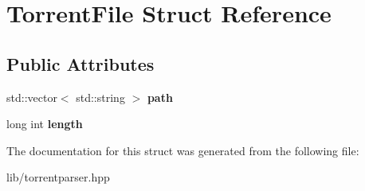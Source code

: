 \hypertarget{structTorrentFile}{}\section{Torrent\+File Struct Reference}
\label{structTorrentFile}
\subsection*{Public Attributes}
\begin{DoxyCompactItemize}
\item 
\mbox{\label{structTorrentFile_af01926bfbda73df36e9648d35c973470}} 
std\+::vector$<$ std\+::string $>$ {\bfseries path}
\item 
\mbox{\label{structTorrentFile_a325e8999959721baf05d23b14349dcd7}} 
long int {\bfseries length}
\end{DoxyCompactItemize}


The documentation for this struct was generated from the following file\+:\begin{DoxyCompactItemize}
\item 
lib/torrentparser.\+hpp\end{DoxyCompactItemize}
